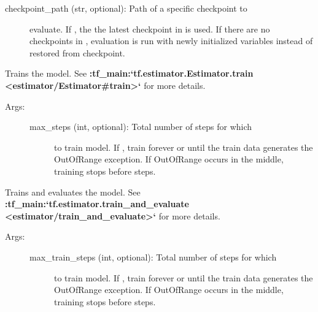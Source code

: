 \documentclass[letterpaper,10pt,english]{sphinxmanual}
\begin{document}
\begin{fulllineitems}
\begin{fulllineitems}
\begin{description}
\begin{description}
\item[{checkpoint\_path (str, optional): Path of a specific checkpoint to}] \leavevmode
evaluate. If , the the latest checkpoint in
 is used. If there are no checkpoints
in , evaluation is run with newly initialized
variables instead of restored from checkpoint.

\end{description}

\end{description}

\end{fulllineitems}


\begin{fulllineitems}
\label{\detokenize{code/run:shabda.run.Executor.train}}
Trains the model. See {\color{red}\bfseries{}:tf\_main:{}`tf.estimator.Estimator.train
\textless{}estimator/Estimator\#train\textgreater{}{}`} for more details.
\begin{description}
\item[{Args:}] \leavevmode\begin{description}
\item[{max\_steps (int, optional): Total number of steps for which}] \leavevmode
to train model. If , train forever or until the train
data generates the OutOfRange exception. If OutOfRange occurs
in the middle, training stops before  steps.

\end{description}

\end{description}

\end{fulllineitems}


\begin{fulllineitems}
\label{\detokenize{code/run:shabda.run.Executor.train_and_evaluate}}
Trains and evaluates the model. See
{\color{red}\bfseries{}:tf\_main:{}`tf.estimator.train\_and\_evaluate
\textless{}estimator/train\_and\_evaluate\textgreater{}{}`} for more details.
\begin{description}
\item[{Args:}] \leavevmode\begin{description}
\item[{max\_train\_steps (int, optional): Total number of steps for which}] \leavevmode
to train model. If , train forever or until the train
data generates the OutOfRange exception. If OutOfRange occurs
in the middle, training stops before  steps.


\end{description}
\end{description}
\end{fulllineitems}
\end{fulllineitems}
\end{document}
